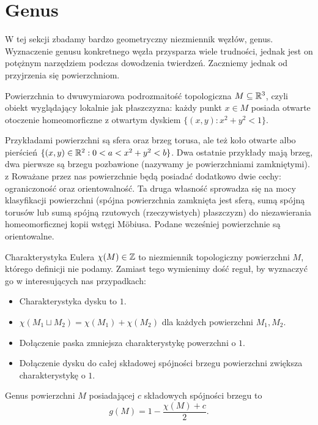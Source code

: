\section{Genus} %
\label{sec:genus}
W tej sekcji zbadamy bardzo geometryczny niezmiennik węzłów, genus.
Wyznaczenie genusu konkretnego węzła przysparza wiele trudności, jednak jest on potężnym narzędziem podczas dowodzenia twierdzeń.
Zaczniemy jednak od przyjrzenia się powierzchniom.

\begin{definition} 
    Powierzchnia to dwuwymiarowa podrozmaitość topologiczna $M \subseteq \mathbb R^3$, czyli obiekt wyglądający lokalnie jak płaszczyzna: każdy punkt $x \in M$ posiada otwarte otoczenie homeomorficzne z otwartym dyskiem $\{(x,y) : x^2 + y^2 < 1\}$.
\end{definition}

Przykładami powierzchni są sfera oraz brzeg torusa, ale też koło otwarte albo pierścień $\{(x, y) \in \mathbb R^2 : 0 < a < x^2 + y^2 < b\}$.
Dwa ostatnie przykłady mają brzeg, dwa pierwsze są brzegu pozbawione (nazywamy je powierzchniami zamkniętymi).
z
Roważane przez nas powierzchnie będą posiadać dodatkowo dwie cechy: ograniczoność oraz orientowalność.
Ta druga własność sprowadza się na mocy klasyfikacji powierzchni (spójna powierzchnia zamknięta jest sferą, sumą spójną torusów lub sumą spójną rzutowych (rzeczywistych) płaszczyzn) do niezawierania homeomorficznej kopii wstęgi Möbiusa.
Podane wcześniej powierzchnie są orientowalne.

\begin{definition} 
    Charakterystyka Eulera $\chi(M) \in \mathbb Z$ to niezmiennik
    topologiczny powierzchni $M$, którego definicji nie podamy.
    Zamiast tego wymienimy dość reguł,
    by wyznaczyć go w interesujących nas przypadkach:
    \begin{itemize}
        \item Charakterystyka dysku to $1$.
        \item $\chi(M_1 \sqcup M_2)=\chi(M_1) + \chi(M_2)$ dla każdych powierzchni $M_1, M_2$.
        \item Dołączenie paska zmniejsza charakterystykę powerzchni o $1$.
        \item Dołączenie dysku do całej składowej spójności brzegu powierzchni zwiększa charakterystykę o $1$.
    \end{itemize}
\end{definition}

\begin{definition} 
    Genus powierzchni $M$ posiadającej $c$ składowych spójności brzegu to
    \[
        g(M) = 1 - \frac{\chi(M) + c}{2}.
    \]
\end{definition}


